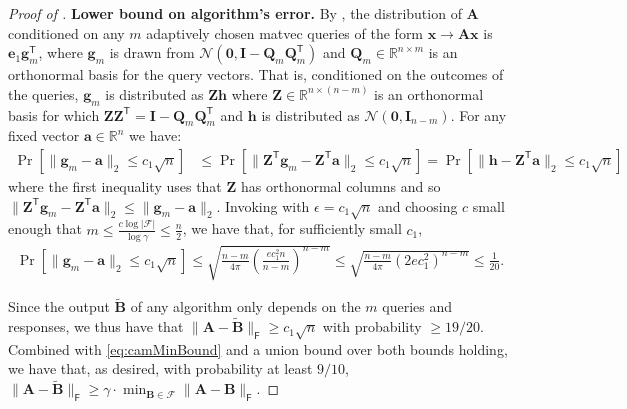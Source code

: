 \documentclass{article}[11pt]
\theoremstyle{definition}
\newcommand{\bv}[1]{\boldsymbol{\mathbf{#1}}}
\newcommand{\R}{\mathbb{R}}
\newcommand{\T}{\mathsf{T}}
\newcommand{\Fro}{\mathsf{F}}
\newcommand{\F}{\mathcal{F}}
\begin{document}
\begin{proof}[Proof of ]
\noindent \textbf{Lower bound on algorithm's error.}
By , the  distribution of $\bv{A}$ conditioned on any $m$ adaptively chosen matvec queries of the form $\bv x \rightarrow \bv A \bv x$ is $\bv e_1 \bv g_m^\T$, where $\bv g_m$ is drawn from $\mathcal{N}(\bv 0,\bv I - \bv Q_m \bv Q_m^\T)$ and $\bv Q_m \in \R^{n \times m}$ is an orthonormal basis for the query vectors. That is, conditioned on the outcomes of the queries, $\bv g_m$ is distributed as $\bv Z \bv h$ where $\bv Z \in \R^{n \times (n-m)}$ is an orthonormal basis for which $\bv Z \bv Z^\T = \bv {I} - \bv Q_m \bv Q_m^\T$ and $\bv h$ is distributed as $\mathcal{N}(\bv 0,\bv I_{n-m})$.
For any fixed vector $\bv a \in \R^{n}$ we have: 
\begin{align*}
    \Pr[\|\bv g_m - \bv a\|_2 \leq c_1 \sqrt{n}] &\le \Pr[\|\bv Z^\T \bv g_m -\bv Z^\T\bv a\|_2 \leq c_1 \sqrt{n}] = \Pr[\|\bv h -\bv Z^\T\bv a\|_2 \leq c_1 \sqrt{n}]
\end{align*}
where the first inequality uses that $\bv {Z}$ has orthonormal columns and so $\|\bv Z^\T \bv g_m -\bv Z^\T\bv a\|_2  \le \|\bv g_m -\bv a\|_2 $.
Invoking  with $\epsilon = c_1 \sqrt{n}$ and choosing $c$ small enough that $m \le \frac{c \log |\mathcal F|}{\log \gamma} \le \frac{n}{2}$, we have that, for sufficiently small $c_1$,
\begin{align*}
\Pr\left[\|\bv g_m - \bv a\|_2 \leq c_1 \sqrt{n}\right] \leq \sqrt{\frac{n-m}{4\pi}\left(\frac{e c_1^2 n}{n-m}\right)^{n-m}}
\leq \sqrt{\frac{n-m}{4\pi}\left(2e c_1^2\right)^{n-m}}
\leq \frac{1}{20}.
\end{align*}

Since the output $\bv{\tilde B}$ of any algorithm only depends on the $m$ queries and responses, we thus have that $\|\bv A - \bv{\tilde B}\|_\Fro \geq c_1 \sqrt{n}$ with probability $\geq 19/20$. Combined with \eqref{eq:camMinBound} and a union bound over both bounds holding, we have that, as desired, with probability at least $9/10$,
$\|\bv A - \bv{\tilde B}\|_\Fro \geq \gamma \cdot  \min_{\bv B \in \F} \|\bv A - \bv B\|_\Fro$.
\end{proof}
\end{document}
